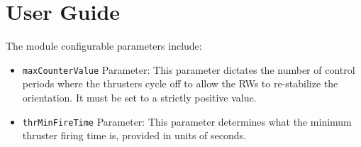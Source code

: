 \documentclass[]{BasiliskReportMemo}
\begin{document}
\section{User Guide}
The module configurable parameters include:
\begin{itemize}
	\item {{\tt maxCounterValue} Parameter}:
This parameter dictates the number of control periods where the thrusters cycle off to allow the RWs to re-stabilize the orientation.  It must be set to a strictly positive value.

	\item {{\tt thrMinFireTime} Parameter}:
This parameter determines what the minimum thruster firing time is, provided in units of seconds.
\end{itemize}
\end{document}
